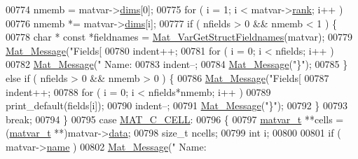 \begin{DoxyCode}
{{{{{{{{{{{{{{{{{{{{{{{{{{{{{{{{{{{{{{{{{00774             nmemb = matvar->\hyperlink{group___m_a_t_a8e01234e1c862ce3472bb37f5a09b92c}{dims}[0];
00775             \textcolor{keywordflow}{for} ( i = 1; i < matvar->\hyperlink{group___m_a_t_a84ba70c96ded13cc555fa75b768d9921}{rank}; i++ )
00776                 nmemb *= matvar->\hyperlink{group___m_a_t_a8e01234e1c862ce3472bb37f5a09b92c}{dims}[i];
00777             if ( nfields > 0 && nmemb < 1 ) \{
00778                 \textcolor{keywordtype}{char} * \textcolor{keyword}{const} *fieldnames = \hyperlink{group___m_a_t_ga88bc328e59ce1dd8f43e917c07140803}{Mat\_VarGetStructFieldnames}(matvar);
00779                 \hyperlink{group__mat__util_gae7dfa394b111bc908a616f8f5bddaa97}{Mat\_Message}(\textcolor{stringliteral}{"Fields[%
00780                 indent++;
00781                 \textcolor{keywordflow}{for} ( i = 0; i < nfields; i++ )
00782                     \hyperlink{group__mat__util_gae7dfa394b111bc908a616f8f5bddaa97}{Mat\_Message}(\textcolor{stringliteral}{"    Name: %
00783                 indent--;
00784                 \hyperlink{group__mat__util_gae7dfa394b111bc908a616f8f5bddaa97}{Mat\_Message}(\textcolor{stringliteral}{"\}"});
00785             \} \textcolor{keywordflow}{else} \textcolor{keywordflow}{if} ( nfields > 0 && nmemb > 0 ) \{
00786                 \hyperlink{group__mat__util_gae7dfa394b111bc908a616f8f5bddaa97}{Mat\_Message}(\textcolor{stringliteral}{"Fields[%
00787                 indent++;
00788                 \textcolor{keywordflow}{for} ( i = 0; i < nfields*nmemb; i++ )
00789                     print\_default(fields[i]);
00790                 indent--;
00791                 \hyperlink{group__mat__util_gae7dfa394b111bc908a616f8f5bddaa97}{Mat\_Message}(\textcolor{stringliteral}{"\}"});
00792             \}
00793             \textcolor{keywordflow}{break};
00794         \}
00795         \textcolor{keywordflow}{case} \hyperlink{group___m_a_t_ggad4d60ae7b709fc81bfd744fb4c857c40a2f7abb47a1c51e248bd4e5e03cc81b08}{MAT\_C\_CELL}:
00796         \{
00797             \hyperlink{group___m_a_t_structmatvar__t}{matvar\_t} **cells = (\hyperlink{group___m_a_t_structmatvar__t}{matvar\_t} **)matvar->\hyperlink{group___m_a_t_a5672978efa230bbdecdf38ede781f7fa}{data};
00798             \textcolor{keywordtype}{size\_t}     ncells;
00799             \textcolor{keywordtype}{int}        i;
00800 
00801             if ( matvar->\hyperlink{group___m_a_t_a5d4b55b041e3b4fb50c04337f05ad909}{name} )
00802                 \hyperlink{group__mat__util_gae7dfa394b111bc908a616f8f5bddaa97}{Mat\_Message}(\textcolor{stringliteral}{"      Name: %
}}}}}}}}}}}}}}}}}}}}}}}}}}}}}}}}}}}}}}}}}}}}}
\end{DoxyCode}
